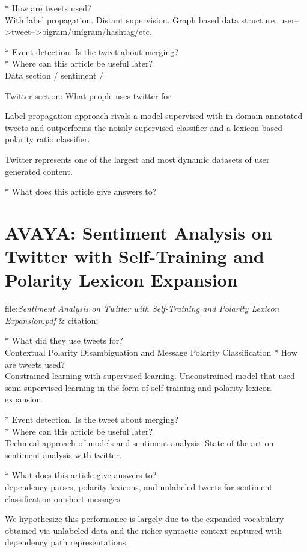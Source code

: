 * How are tweets used?\\
With label propagation.
Distant supervision. 
Graph based data structure. 
user-->tweet-->bigram/unigram/hashtag/etc.  

* Event detection. Is the tweet about merging? \\
* Where can this article be useful later? \\
Data section / sentiment / 

Twitter section: What people uses twitter for. 

Label propagation approach rivals a model supervised with in-domain annotated tweets and outperforms the noisily supervised classifier and a lexicon-based polarity ratio classifier. \cite[]{sperious11}

Twitter represents one of the largest and most dynamic datasets of user
generated content.


* What does this article give answers to?\\


\section{AVAYA: Sentiment Analysis on Twitter with Self-Training and Polarity Lexicon Expansion}
file:\textit{Sentiment Analysis on Twitter with Self-Training and Polarity
Lexicon Expansion.pdf} & citation:\cite[]{becker13}

* What did they use tweets for?\\
Contextual Polarity Disambiguation and Message Polarity Classiﬁcation
* How are tweets used?\\
Constrained learning with supervised learning. 
Unconstrained model that used semi-supervised learning in the form of self-training and polarity lexicon expansion

* Event detection. Is the tweet about merging? \\
* Where can this article be useful later? \\
Technical approach of models and sentiment analysis.
State of the art on sentiment analysis with twitter. 

* What does this article give answers to?\\
dependency parses, polarity lexicons,
and unlabeled tweets for sentiment classification on
short messages

We hypothesize this performance is largely due to the expanded vocabulary obtained via unlabeled data and the richer syntactic context captured with dependency path representations. \cite[]{becker13}


